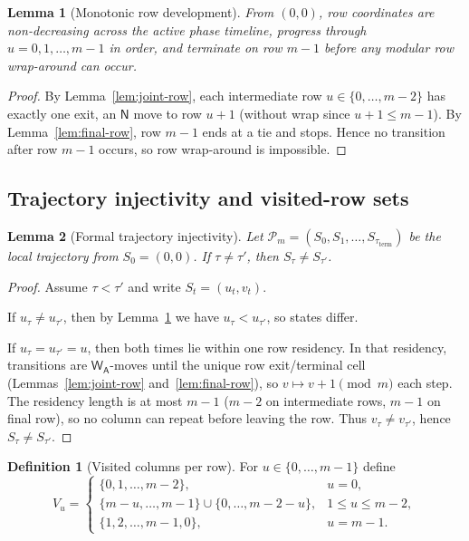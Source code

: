 \documentclass[11pt]{article}
\newtheorem{lemma}{Lemma}
\theoremstyle{definition}
\newtheorem{definition}{Definition}
\theoremstyle{remark}
\newcommand{\WA}{\mathsf{W_A}}
\newcommand{\NN}{\mathsf{N}}
\begin{document}
\begin{lemma}[Monotonic row development]\label{lem:row-mono}
From $(0,0)$, row coordinates are non-decreasing across the active phase timeline, progress through
$u=0,1,\dots,m-1$ in order, and terminate on row $m-1$ before any modular row wrap-around can occur.
\end{lemma}
\begin{proof}
By Lemma~\ref{lem:joint-row}, each intermediate row $u\in\{0,\dots,m-2\}$ has exactly one exit, an $\NN$ move to
row $u+1$ (without wrap since $u+1\le m-1$). By Lemma~\ref{lem:final-row}, row $m-1$ ends at a tie and stops.
Hence no transition after row $m-1$ occurs, so row wrap-around is impossible.
\end{proof}

\subsection{Trajectory injectivity and visited-row sets}
\begin{lemma}[Formal trajectory injectivity]\label{lem:traj-inj}
Let $\mathcal P_m=(S_0,S_1,\dots,S_{\tau_{\mathrm{term}}})$ be the local trajectory from $S_0=(0,0)$. If
$\tau\neq\tau'$, then $S_\tau\neq S_{\tau'}$.
\end{lemma}
\begin{proof}
Assume $\tau<\tau'$ and write $S_t=(u_t,v_t)$.

If $u_\tau\neq u_{\tau'}$, then by Lemma~\ref{lem:row-mono} we have $u_\tau<u_{\tau'}$, so states differ.

If $u_\tau=u_{\tau'}=u$, then both times lie within one row residency. In that residency, transitions are
$\WA$-moves until the unique row exit/terminal cell (Lemmas~\ref{lem:joint-row} and~\ref{lem:final-row}), so
$v\mapsto v+1\pmod m$ each step. The residency length is at most $m-1$ ($m-2$ on intermediate rows, $m-1$
on final row), so no column can repeat before leaving the row. Thus $v_\tau\neq v_{\tau'}$, hence
$S_\tau\neq S_{\tau'}$.
\end{proof}

\begin{definition}[Visited columns per row]\label{def:Vu}
For $u\in\{0,\dots,m-1\}$ define
\[
V_u=
\begin{cases}
\{0,1,\dots,m-2\}, & u=0,\\
\{m-u,\dots,m-1\}\cup\{0,\dots,m-2-u\}, & 1\le u\le m-2,\\
\{1,2,\dots,m-1,0\}, & u=m-1.
\end{cases}
\]
\end{definition}
\end{document}
